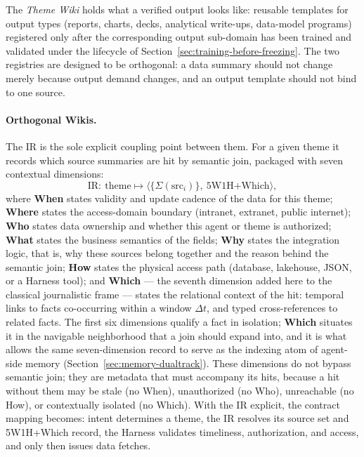 The \textit{Theme Wiki} holds what a verified output looks like: reusable templates for output types (reports, charts, decks, analytical write-ups, data-model programs) registered only after the corresponding output sub-domain has been trained and validated under the lifecycle of Section~\ref{sec:training-before-freezing}. The two registries are designed to be orthogonal: a data summary should not change merely because output demand changes, and an output template should not bind to one source.

\paragraph{Orthogonal Wikis.}
The IR is the sole explicit coupling point between them. For a given theme it records which source summaries are hit by semantic join, packaged with seven contextual dimensions:
\begin{equation}
\mathrm{IR}:\ \mathrm{theme} \mapsto \langle \{\Sigma(\mathrm{src}_i)\},\ \mathrm{5W1H}\mathrm{+}\mathrm{Which} \rangle,
\end{equation}
where \textbf{When} states validity and update cadence of the data for this theme; \textbf{Where} states the access-domain boundary (intranet, extranet, public internet); \textbf{Who} states data ownership and whether this agent or theme is authorized; \textbf{What} states the business semantics of the fields; \textbf{Why} states the integration logic, that is, why these sources belong together and the reason behind the semantic join; \textbf{How} states the physical access path (database, lakehouse, JSON, or a Harness tool); and \textbf{Which} --- the seventh dimension added here to the classical journalistic frame --- states the relational context of the hit: temporal links to facts co-occurring within a window $\Delta t$, and typed cross-references to related facts. The first six dimensions qualify a fact in isolation; \textbf{Which} situates it in the navigable neighborhood that a join should expand into, and it is what allows the same seven-dimension record to serve as the indexing atom of agent-side memory (Section~\ref{sec:memory-dualtrack}). These dimensions do not bypass semantic join; they are metadata that must accompany its hits, because a hit without them may be stale (no When), unauthorized (no Who), unreachable (no How), or contextually isolated (no Which). With the IR explicit, the contract mapping becomes: intent determines a theme, the IR resolves its source set and 5W1H+Which record, the Harness validates timeliness, authorization, and access, and only then issues data fetches.

